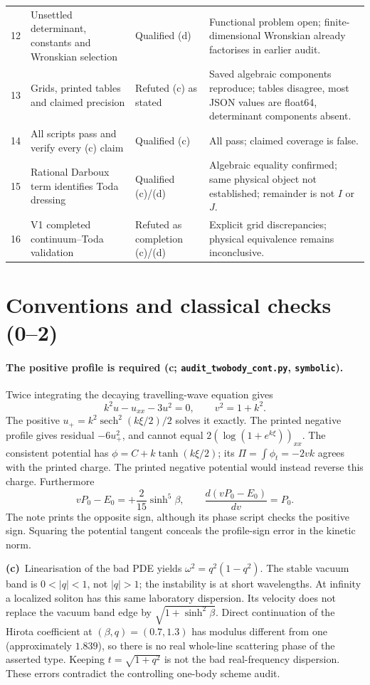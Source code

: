 \documentclass[11pt,a4paper]{article}
\newcommand{\Lc}{\textbf{(c)}\ }
\newcommand{\scr}{\texttt{audit\_\allowbreak twobody\_\allowbreak cont.py}}
\begin{document}
\begin{longtable}{@{}L{.7cm}L{5.7cm}L{2.3cm}L{6.1cm}@{}}
12 & Unsettled determinant, constants and Wronskian selection & Qualified (d) & Functional problem open; finite-dimensional Wronskian already factorises in earlier audit.\\
13 & Grids, printed tables and claimed precision & Refuted (c) as stated & Saved algebraic components reproduce; tables disagree, most JSON values are float64, determinant components absent.\\
14 & All scripts pass and verify every (c) claim & Qualified (c) & All pass; claimed coverage is false.\\
15 & Rational Darboux term identifies Toda dressing & Qualified (c)/(d) & Algebraic equality confirmed; same physical object not established; remainder is not $I$ or $J$.\\
16 & V1 completed continuum--Toda validation & Refuted as completion (c)/(d) & Explicit grid discrepancies; physical equivalence remains inconclusive.\\
\bottomrule
\end{longtable}

\section{Conventions and classical checks (0--2)}
\paragraph{The positive profile is required (c; \scr, \texttt{symbolic}).}
Twice integrating the decaying travelling-wave equation gives
\[
 k^2u-u_{xx}-3u^2=0,\qquad v^2=1+k^2.
\]
The positive $u_+=k^2\operatorname{sech}^2(k\xi/2)/2$ solves it exactly.
The printed negative profile gives residual $-6u_+^2$, and cannot equal
$2(\log(1+e^{k\xi}))_{xx}$. The consistent potential has
$\phi=C+k\tanh(k\xi/2)$; its $\Pi=\int\phi_t=-2vk$ agrees with the printed
charge. The printed negative potential would instead reverse this charge.
Furthermore
\[
 vP_0-E_0=+\frac{2}{15}\sinh^5\beta,\qquad
 \frac{d(vP_0-E_0)}{dv}=P_0.
\]
The note prints the opposite sign, although its phase script checks the
positive sign. Squaring the potential tangent conceals the profile-sign
error in the kinetic norm.

\Lc Linearisation of the bad PDE yields $\omega^2=q^2(1-q^2)$.
The stable vacuum band is $0<|q|<1$, not $|q|>1$; the instability is at
short wavelengths. At infinity a localized soliton has this same laboratory
dispersion. Its velocity does not replace the vacuum band edge by
$\sqrt{1+\sinh^2\beta}$. Direct continuation of the Hirota coefficient at
$(\beta,q)=(0.7,1.3)$ has modulus different from one (approximately $1.839$),
so there is no real whole-line scattering phase of the asserted type.
Keeping $t=\sqrt{1+q^2}$ is not the bad real-frequency dispersion.
These errors contradict the controlling one-body scheme audit.
\end{document}
